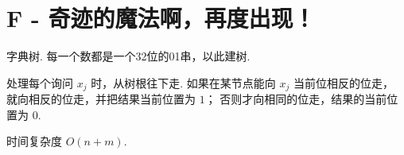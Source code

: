 \documentclass{ctexart}
\begin{document}
\section*{F - 奇迹的魔法啊，再度出现！}

字典树. 每一个数都是一个32位的01串，以此建树.

处理每个询问 $x_j$ 时，从树根往下走.
如果在某节点能向 $x_j$ 当前位相反的位走，
就向相反的位走，并把结果当前位置为 $1$；
否则才向相同的位走，结果的当前位置为 $0$.

时间复杂度 $O(n+m)$.
\end{document}
